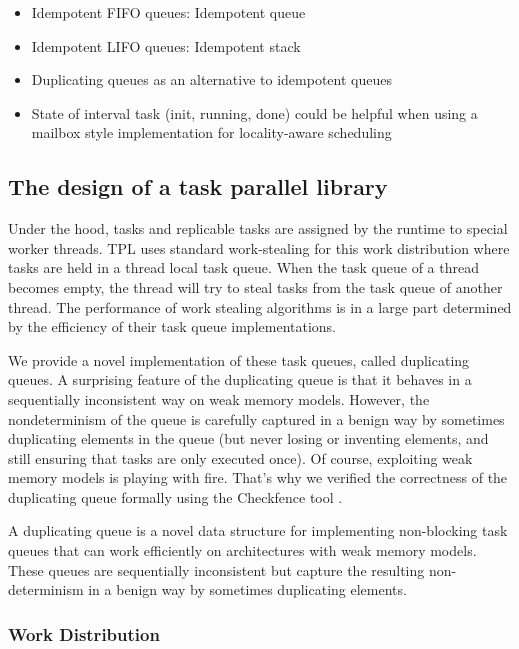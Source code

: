 
\begin{itemize}
\item Idempotent FIFO queues: Idempotent queue
\item Idempotent LIFO queues: Idempotent stack
\item Duplicating queues as an alternative to idempotent queues
\item State of interval task (init, running, done) could be helpful
  when using a mailbox style implementation for locality-aware
  scheduling \cite{Acar2002}
\end{itemize}

\subsection{The design of a task parallel library \cite{Leijen2009}}

Under the hood, tasks and replicable tasks are assigned by the runtime
to special worker threads. TPL uses standard work-stealing for this
work distribution \cite{Frigo1998} where tasks are held in a thread
local task queue. When the task queue of a thread becomes empty, the
thread will try to steal tasks from the task queue of another
thread. The performance of work stealing algorithms is in a large part
determined by the efficiency of their task queue implementations.

We provide a novel implementation of these task queues, called
duplicating queues. A surprising feature of the duplicating queue is
that it behaves in a sequentially inconsistent way on weak memory
models. However, the nondeterminism of the queue is carefully captured
in a benign way by sometimes duplicating elements in the queue (but
never losing or inventing elements, and still ensuring that tasks are
only executed once). Of course, exploiting weak memory models is
playing with fire. That's why we verified the correctness of the
duplicating queue formally using the Checkfence tool
\cite{Burckhardt2007, Burckhardt2007a}.

A duplicating queue is a novel data structure for implementing
non-blocking task queues that can work efficiently on architectures
with weak memory models. These queues are sequentially inconsistent
but capture the resulting non-determinism in a benign way by sometimes
duplicating elements.

\subsubsection{Work Distribution}

